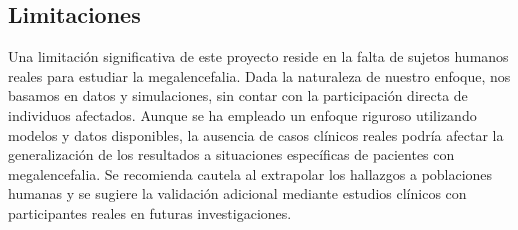 \subsection{Limitaciones}
Una limitación significativa de este proyecto reside en la falta de sujetos humanos reales para estudiar la megalencefalia. Dada la naturaleza de nuestro enfoque, nos basamos en datos y simulaciones, sin contar con la participación directa de individuos afectados. Aunque se ha empleado un enfoque riguroso utilizando modelos y datos disponibles, la ausencia de casos clínicos reales podría afectar la generalización de los resultados a situaciones específicas de pacientes con megalencefalia. Se recomienda cautela al extrapolar los hallazgos a poblaciones humanas y se sugiere la validación adicional mediante estudios clínicos con participantes reales en futuras investigaciones. 

